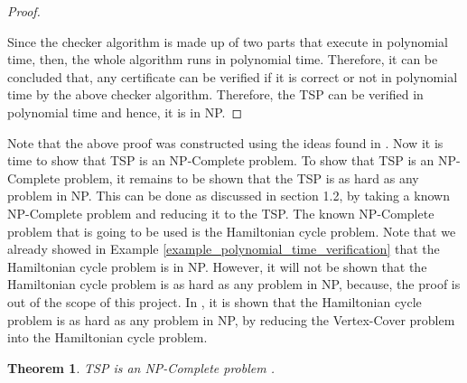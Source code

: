 \documentclass{article}
\newtheorem{theorem}[definition]{Theorem}
\begin{document}
\begin{proof}
\begin{itemize}
\end{itemize} 
Since the checker algorithm is made up of two parts that execute in polynomial time, then, the whole algorithm runs in polynomial time. Therefore, it can be concluded that, any certificate can be verified if it is correct or not in polynomial time by the above checker algorithm. Therefore, the TSP can be verified in polynomial time and hence, it is in NP. 
\end{proof}
Note that the above proof was constructed using the ideas found in \cite{cormen_leiserson_rivest_stein}. Now it is time to show that TSP is an NP-Complete problem.  To show that TSP is an NP-Complete problem, it remains to be shown that the TSP is as hard as any problem in NP. This can be done as discussed in section 1.2, by taking a known NP-Complete problem and reducing it to the TSP. The known NP-Complete problem that is going to be used is the Hamiltonian cycle problem. Note that we already showed in Example \ref{example_polynomial_time_verification} that the Hamiltonian cycle problem is in NP. However, it will not be shown that the Hamiltonian cycle problem is as hard as any problem in NP, because, the proof is out of the scope of this project. In \cite{cormen_leiserson_rivest_stein}, it is shown that the Hamiltonian cycle problem is as hard as any problem in NP, by reducing the Vertex-Cover problem into the Hamiltonian cycle problem.
\begin{theorem}
\label{TSP_NP-Complete}
TSP is an NP-Complete problem {}. 
\end{theorem}
\end{document}
